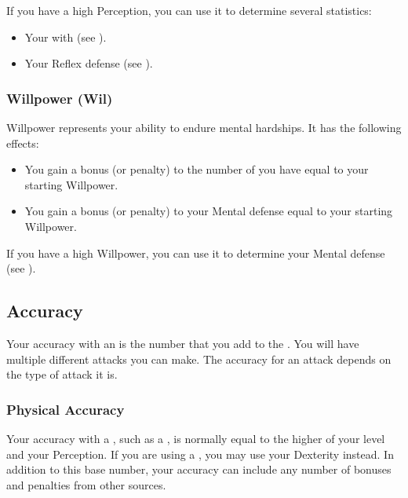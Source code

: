             If you have a high Perception, you can use it to determine several statistics:
            \begin{itemize}
                \item Your  with  (see ).
                \item Your Reflex defense (see ).
            \end{itemize}

        \subsubsection{Willpower (Wil)}\label{Willpower}
            Willpower represents your ability to endure mental hardships.
            It has the following effects:
            \begin{itemize}
                \item You gain a bonus (or penalty) to the number of  you have equal to your starting Willpower.
                \item You gain a bonus (or penalty) to your Mental defense equal to your starting Willpower.
            \end{itemize}

            If you have a high Willpower, you can use it to determine your Mental defense (see ).

    \subsection{Accuracy}\label{Accuracy}
        Your accuracy with an  is the number that you add to the .
        You will have multiple different attacks you can make.
        The accuracy for an attack depends on the type of attack it is.

        \subsubsection{Physical Accuracy}\label{Physical Accuracy}
            Your accuracy with a , such as a , is normally equal to the higher of your level and your Perception.
            If you are using a , you may use your Dexterity instead.
            In addition to this base number, your accuracy can include any number of bonuses and penalties from other sources.

